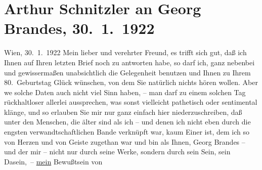                \section[Arthur Schnitzler an Georg Brandes, 30. 1. 1922]{ Arthur Schnitzler an Georg Brandes, 30. 1. 1922}\nopagebreak{}\rehead{ }\begin{ledgroupsized}[t]{13cm}\normalsize\beginnumbering \toendnotes[C]{\smallbreak\pagebreak[2]} 
\toendnotes[C]{\smallbreak}\pstart
           \raggedleft{}{\pb}Wien, 30. 1. 1922\pend
           \pstart
           Mein lieber und verehrter Freund, es trifft sich gut, daß ich Ihnen
               auf Ihren letzten Brief noch zu antworten habe, so darf ich, ganz nebenbei und
               gewissermaßen unabsichtlich die Gelegenheit benutzen und Ihnen zu Ihrem
               80. Geburtstag Glück wünschen, von dem Sie natürlich nichts hören wollen. Aber we{\geminationn} solche Daten auch nicht viel Sinn haben, – man darf zu
               einem solchen Tag rückhaltloser  allerlei
               aussprechen, was sonst vielleicht pathetisch oder sentimental klänge, und so erlauben
               Sie mir nur ganz einfach hier niederzuschreiben, daß unter den Menschen, die älter
               sind als ich – und denen ich nicht eben durch die engsten verwandtschaftlichen Bande
               verknüpft war, kaum Einer ist, dem ich so von Herzen und von Geiste zugethan war und
               bin als Ihnen, Georg Brandes – und der mir – nicht nur durch seine Werke, sondern
               durch sein Sein, sein Dasein, – \uline{mein} Bewußtsein von

\end{ledgroupsized}
